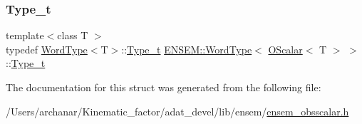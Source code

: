 \mbox{\label{structENSEM_1_1WordType_3_01OScalar_3_01T_01_4_01_4_a8fa9533e78185900519355e6b5dc8ab5}} 
\subsubsection{\texorpdfstring{Type\_t}{Type\_t}\hspace{0.1cm}{\footnotesize\ttfamily [2/2]}}
{\footnotesize\ttfamily template$<$class T $>$ \\
typedef \mbox{\hyperlink{structENSEM_1_1WordType}{Word\+Type}}$<$T$>$\+::\mbox{\hyperlink{structENSEM_1_1WordType_3_01OScalar_3_01T_01_4_01_4_a8fa9533e78185900519355e6b5dc8ab5}{Type\+\_\+t}} \mbox{\hyperlink{structENSEM_1_1WordType}{E\+N\+S\+E\+M\+::\+Word\+Type}}$<$ \mbox{\hyperlink{classENSEM_1_1OScalar}{O\+Scalar}}$<$ T $>$ $>$\+::\mbox{\hyperlink{structENSEM_1_1WordType_3_01OScalar_3_01T_01_4_01_4_a8fa9533e78185900519355e6b5dc8ab5}{Type\+\_\+t}}}



The documentation for this struct was generated from the following file\+:\begin{DoxyCompactItemize}
\item 
/\+Users/archanar/\+Kinematic\+\_\+factor/adat\+\_\+devel/lib/ensem/\mbox{\hyperlink{lib_2ensem_2ensem__obsscalar_8h}{ensem\+\_\+obsscalar.\+h}}\end{DoxyCompactItemize}
